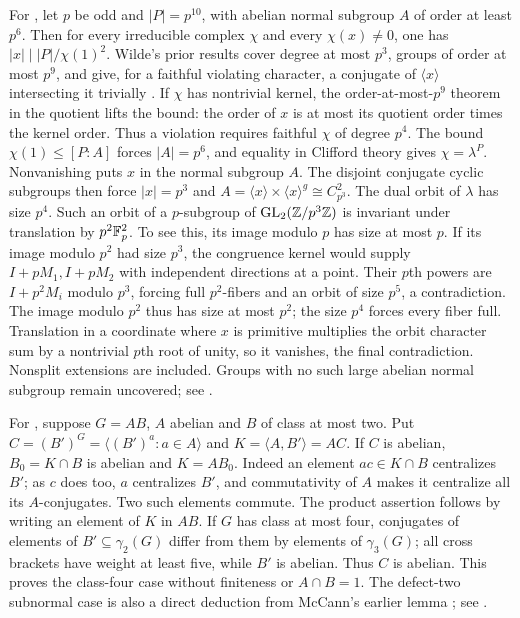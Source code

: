 \label{partial:19.108}
For , let \(p\) be odd and \(|P|=p^{10}\), with
abelian normal subgroup \(A\) of order at least \(p^6\).
Then for every irreducible complex \(\chi\) and every
\(\chi(x)\ne0\), one has \(|x|\mid |P|/\chi(1)^2\).
Wilde's prior results cover degree at most \(p^3\), groups
of order at most \(p^9\), and give, for a faithful violating
character, a conjugate of \(\langle x\rangle\) intersecting it
trivially \cite{wilde-supports}.
If \(\chi\) has nontrivial kernel, the order-at-most-\(p^9\)
theorem in the quotient lifts the bound: the order of \(x\)
is at most its quotient order times the kernel order.
Thus a violation requires faithful \(\chi\) of degree \(p^4\).
The bound \(\chi(1)\le[P:A]\) forces \(|A|=p^6\),
and equality in Clifford theory gives \(\chi=\lambda^P\).
Nonvanishing puts \(x\) in the normal subgroup \(A\).
The disjoint conjugate cyclic subgroups then force \(|x|=p^3\)
and \(A=\langle x\rangle\times\langle x\rangle^g
\cong C_{p^3}^2\). The dual orbit of \(\lambda\) has size \(p^4\).
Such an orbit of a \(p\)-subgroup of
\(\operatorname{GL}_2(\mathbb Z/p^3\mathbb Z)\) is invariant under translation by \(p^2\mathbb F_p^2\).
To see this, its image modulo \(p\) has size at most \(p\).
If its image modulo \(p^2\) had size \(p^3\), the congruence
kernel would supply \(I+pM_1,I+pM_2\) with independent
directions at a point. Their \(p\)th powers are
\(I+p^2M_i\) modulo \(p^3\), forcing full \(p^2\)-fibers and
an orbit of size \(p^5\), a contradiction. The image modulo
\(p^2\) thus has size at most \(p^2\); the size \(p^4\)
forces every fiber full. Translation in a coordinate where
\(x\) is primitive multiplies the orbit character sum by a
nontrivial \(p\)th root of unity, so it vanishes, the final
contradiction. Nonsplit extensions are included.
Groups with no such large abelian normal subgroup remain
uncovered; see .

\label{partial:18.120}
For , suppose \(G=AB\), \(A\) abelian and \(B\)
of class at most two. Put \(C=(B')^G=\langle(B')^a:a\in A\rangle\)
and \(K=\langle A,B'\rangle=AC\).
If \(C\) is abelian, \(B_0=K\cap B\) is abelian and \(K=AB_0\).
Indeed an element \(ac\in K\cap B\) centralizes \(B'\);
as \(c\) does too, \(a\) centralizes \(B'\), and commutativity
of \(A\) makes it centralize all its \(A\)-conjugates.
Two such elements commute. The product assertion follows
by writing an element of \(K\) in \(AB\).
If \(G\) has class at most four, conjugates of elements of
\(B'\subseteq\gamma_2(G)\) differ from them by elements
of \(\gamma_3(G)\); all cross brackets have weight at least
five, while \(B'\) is abelian. Thus \(C\) is abelian.
This proves the class-four case without finiteness or
\(A\cap B=1\). The defect-two subnormal case is also a direct
deduction from McCann's earlier lemma \cite{mccann};
see .

